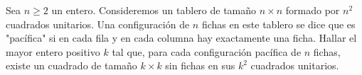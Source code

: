 Sea $n \geq 2$ un entero. Consideremos un tablero de tamaño $n \times n$ formado por $n^2$ cuadrados unitarios. Una configuración de $n$ fichas en este tablero se dice que es "pacífica" si en cada fila y en cada columna hay exactamente una ficha. Hallar el mayor entero positivo $k$ tal que, para cada configuración pacífica de $n$ fichas, existe un cuadrado de tamaño $k \times k$ sin fichas en sus $k^2$ cuadrados unitarios.
